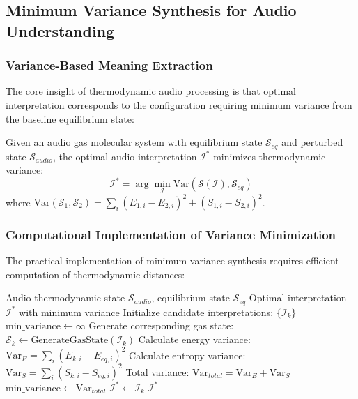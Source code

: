 \subsection{Minimum Variance Synthesis for Audio Understanding}

\subsubsection{Variance-Based Meaning Extraction}

The core insight of thermodynamic audio processing is that optimal interpretation corresponds to the configuration requiring minimum variance from the baseline equilibrium state:

\begin{definition}
Given an audio gas molecular system with equilibrium state $\mathcal{S}_{eq}$ and perturbed state $\mathcal{S}_{audio}$, the optimal audio interpretation $\mathcal{I}^*$ minimizes thermodynamic variance:
\begin{equation}
\mathcal{I}^* = \arg\min_{\mathcal{I}} \text{Var}(\mathcal{S}(\mathcal{I}), \mathcal{S}_{eq})
\end{equation}
where $\text{Var}(\mathcal{S}_1, \mathcal{S}_2) = \sum_{i} (E_{1,i} - E_{2,i})^2 + (S_{1,i} - S_{2,i})^2$.
\end{definition}

\subsubsection{Computational Implementation of Variance Minimization}

The practical implementation of minimum variance synthesis requires efficient computation of thermodynamic distances:

\begin{algorithm}[H]
\caption{Audio Minimum Variance Synthesis}
\begin{algorithmic}[1]
\REQUIRE Audio thermodynamic state $\mathcal{S}_{audio}$, equilibrium state $\mathcal{S}_{eq}$
\ENSURE Optimal interpretation $\mathcal{I}^*$ with minimum variance
\STATE Initialize candidate interpretations: $\{\mathcal{I}_k\}$
\STATE $\text{min\_variance} \leftarrow \infty$
    \STATE Generate corresponding gas state: $\mathcal{S}_k \leftarrow \text{GenerateGasState}(\mathcal{I}_k)$
    \STATE Calculate energy variance: $\text{Var}_E = \sum_i (E_{k,i} - E_{eq,i})^2$
    \STATE Calculate entropy variance: $\text{Var}_S = \sum_i (S_{k,i} - S_{eq,i})^2$ 
    \STATE Total variance: $\text{Var}_{total} = \text{Var}_E + \text{Var}_S$
        \STATE $\text{min\_variance} \leftarrow \text{Var}_{total}$
        \STATE $\mathcal{I}^* \leftarrow \mathcal{I}_k$
    \ENDIF
\ENDFOR
\RETURN $\mathcal{I}^*$
\end{algorithmic}
\end{algorithm}

